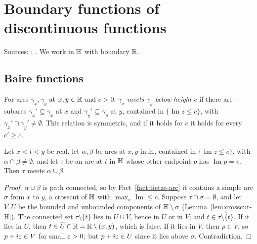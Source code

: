 \section{Boundary functions of discontinuous functions}\label{sec:discont}
Sources: \cite[Chapter II]{Diss}; \cite[Theorems 4--6]{JMM}. We work in $\mathbb{H}$ with boundary $\mathbb{R}$.

\subsection{Baire functions}

\begin{definition}\label{def:meets-in}
For arcs $\gamma_x,\gamma_y$ at $x,y\in\mathbb{R}$ and $c>0$, $\gamma_x$ \emph{meets $\gamma_y$ below height $c$} if there are
subarcs $\gamma_x'\subseteq\gamma_x$ at $x$ and $\gamma_y'\subseteq\gamma_y$ at $y$, contained in $\{\operatorname{Im}z\le c\}$,
with $\gamma_x'\cap\gamma_y'\ne\emptyset$. This relation is symmetric, and if it holds for $c$ it holds for every $c'\ge c$.
\end{definition}

\begin{lemma}\label{lem:figure5}
Let $x<t<y$ be real, let $\alpha,\beta$ be arcs at $x,y$ in $\mathbb{H}$, contained in $\{\operatorname{Im}z\le c\}$, with
$\alpha\cap\beta\ne\emptyset$, and let $\tau$ be an arc at $t$ in $\mathbb{H}$ whose other endpoint $p$ has $\operatorname{Im}p=c$.
Then $\tau$ meets $\alpha\cup\beta$.
\end{lemma}
\begin{proof}
$\alpha\cup\beta$ is path connected, so by Fact~\ref{fact:tietze-arc} it contains a simple arc $\sigma$ from $x$ to $y$, a
crosscut of $\mathbb{H}$ with $\max_\sigma\operatorname{Im}\le c$. Suppose $\tau\cap\sigma=\emptyset$, and let $V,U$ be the bounded and
unbounded components of $\mathbb{H}\setminus\sigma$ (Lemma~\ref{lem:crosscut-H}). The connected set $\tau\setminus\{t\}$ lies in
$U\cup V$, hence in $U$ or in $V$; and $t\in\overline{\tau\setminus\{t\}}$. If it lies in $U$, then
$t\in\overline U\cap\mathbb{R}=\mathbb{R}\setminus(x,y)$, which is false. If it lies in $V$, then $p\in V$, so $p+i\varepsilon\in V$ for small $\varepsilon>0$;
but $p+i\varepsilon\in U$ since it lies above $\sigma$. Contradiction.
\end{proof}

